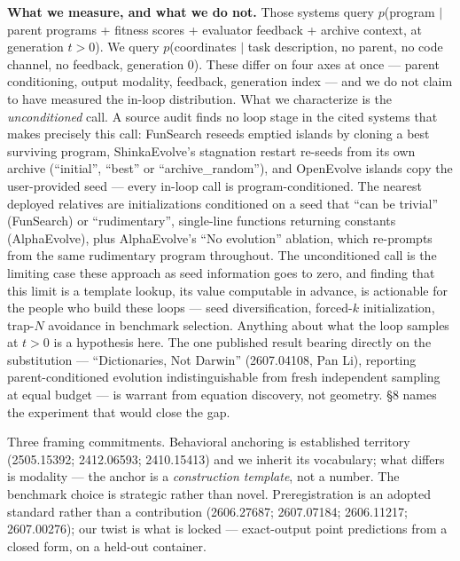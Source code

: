 \documentclass[11pt]{article}
\begin{document}
\textbf{What we measure, and what we do not.} Those systems query $p$(program $\mid$ parent programs +
fitness scores + evaluator feedback + archive context, at generation $t > 0$). We query
$p$(coordinates $\mid$ task description, no parent, no code channel, no feedback, generation 0). These
differ on four axes at once --- parent conditioning, output modality, feedback, generation index
--- and we do not claim to have measured the in-loop distribution. What we characterize is the
\textit{unconditioned} call. A source audit finds no loop stage in the cited systems that makes
precisely this call: FunSearch reseeds emptied islands by cloning a best surviving program,
ShinkaEvolve's stagnation restart re-seeds from its own archive (``initial'', ``best'' or
``archive\_random''), and OpenEvolve islands copy the user-provided seed --- every in-loop call is
program-conditioned. The nearest deployed relatives are initializations conditioned on a seed
that ``can be trivial'' (FunSearch) or ``rudimentary'', single-line functions returning constants
(AlphaEvolve), plus AlphaEvolve's ``No evolution'' ablation, which re-prompts from the same
rudimentary program throughout. The unconditioned call is the limiting case these approach as
seed information goes to zero, and finding that this limit is a template lookup, its value
computable in advance, is actionable for the people who build these loops --- seed
diversification, forced-$k$ initialization, trap-$N$ avoidance in benchmark selection. Anything about what the loop samples at $t > 0$ is a
hypothesis here. The one published result bearing directly on the substitution ---
``Dictionaries, Not Darwin'' (2607.04108, Pan Li), reporting parent-conditioned evolution
indistinguishable from fresh independent sampling at equal budget --- is warrant from equation
discovery, not geometry. \S8 names the experiment that would close the gap.

Three framing commitments. Behavioral anchoring is established territory (2505.15392;
2412.06593; 2410.15413) and we inherit its vocabulary; what differs is modality --- the anchor is
a \textit{construction template}, not a number. The benchmark choice is strategic rather than novel.
Preregistration is an adopted standard rather than a contribution (2606.27687; 2607.07184;
2606.11217; 2607.00276); our twist is what is locked --- exact-output point predictions from a
closed form, on a held-out container.
\end{document}
